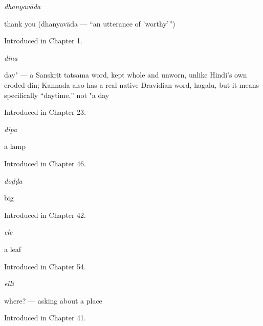 \noindent\begin{minipage}[t]{\linewidth}
\raggedright
\textbf{}\enspace\emph{dhanyavāda}\par
\small thank you (dhanyavāda — \textquotedblleft{}an utterance of 'worthy'\textquotedblright{})\par
\footnotesize Introduced in Chapter 1.
\end{minipage}\par\medskip

\noindent\begin{minipage}[t]{\linewidth}
\raggedright
\textbf{}\enspace\emph{dina}\par
\small day" — a Sanskrit tatsama word, kept whole and unworn, unlike Hindi's own eroded din; Kannada also has a real native Dravidian word, hagalu, but it means specifically \textquotedblleft{}daytime,\textquotedblright{} not "a day\par
\footnotesize Introduced in Chapter 23.
\end{minipage}\par\medskip

\noindent\begin{minipage}[t]{\linewidth}
\raggedright
\textbf{}\enspace\emph{dīpa}\par
\small a lamp\par
\footnotesize Introduced in Chapter 46.
\end{minipage}\par\medskip

\noindent\begin{minipage}[t]{\linewidth}
\raggedright
\textbf{}\enspace\emph{doḍḍa}\par
\small big\par
\footnotesize Introduced in Chapter 42.
\end{minipage}\par\medskip

\noindent\begin{minipage}[t]{\linewidth}
\raggedright
\textbf{}\enspace\emph{ele}\par
\small a leaf\par
\footnotesize Introduced in Chapter 54.
\end{minipage}\par\medskip

\noindent\begin{minipage}[t]{\linewidth}
\raggedright
\textbf{}\enspace\emph{elli}\par
\small where? — asking about a place\par
\footnotesize Introduced in Chapter 41.
\end{minipage}\par\medskip

